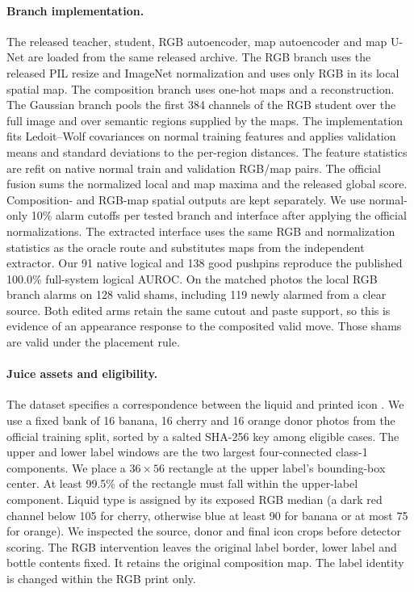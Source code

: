 \documentclass[10pt,twocolumn,letterpaper]{article}
\begin{document}
\paragraph{Branch implementation.}
The released teacher, student, RGB autoencoder, map autoencoder and map U-Net are loaded from the same released archive. The RGB branch uses the released PIL resize and ImageNet normalization and uses only RGB in its local spatial map. The composition branch uses one-hot maps and a reconstruction. The Gaussian branch pools the first 384 channels of the RGB student over the full image and over semantic regions supplied by the maps. The implementation fits Ledoit--Wolf covariances on normal training features and applies validation means and standard deviations to the per-region distances. The feature statistics are refit on native normal train and validation RGB/map pairs. The official fusion sums the normalized local and map maxima and the released global score. Composition- and RGB-map spatial outputs are kept separately. We use normal-only 10\% alarm cutoffs per tested branch and interface after applying the official normalizations. The extracted interface uses the same RGB and normalization statistics as the oracle route and substitutes maps from the independent extractor. Our 91 native logical and 138 good pushpins reproduce the published 100.0\% full-system logical AUROC. On the matched photos the local RGB branch alarms on 128 valid shams, including 119 newly alarmed from a clear source. Both edited arms retain the same cutout and paste support, so this is evidence of an appearance response to the composited valid move. Those shams are valid under the placement rule.

\begin{table}[t]
\centering
\caption{\textbf{Released SALAD with all branches on the matched pushpins.} Strict normal-validation cutoffs, separately for each branch and interface. Wins give paired fault-over-sham direction with half ties. The global branch emits a scalar.}
\label{tab:fullpins}
\small

\end{table}

\paragraph{Juice assets and eligibility.}
The dataset specifies a correspondence between the liquid and printed icon \cite{bergmann2022}. We use a fixed bank of 16 banana, 16 cherry and 16 orange donor photos from the official training split, sorted by a salted SHA-256 key among eligible cases. The upper and lower label windows are the two largest four-connected class-1 components. We place a $36{\times}56$ rectangle at the upper label's bounding-box center. At least 99.5\% of the rectangle must fall within the upper-label component. Liquid type is assigned by its exposed RGB median (a dark red channel below 105 for cherry, otherwise blue at least 90 for banana or at most 75 for orange). We inspected the source, donor and final icon crops before detector scoring. The RGB intervention leaves the original label border, lower label and bottle contents fixed. It retains the original composition map. The label identity is changed within the RGB print only.
\end{document}
